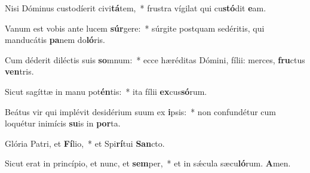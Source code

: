 \item Nisi Dóminus custodíerit civi\textbf{tá}tem,~* frustra vígilat qui cu\textbf{stó}dit \textbf{e}am.
\item Vanum est vobis ante lucem \textbf{súr}gere:~* súrgite postquam sedéritis, qui manducátis \textbf{pa}nem do\textbf{ló}ris.
\item Cum déderit diléctis suis \textbf{so}mnum:~* ecce hæréditas Dómini, fílii: merces, \textbf{fru}ctus \textbf{ven}tris.
\item Sicut sagíttæ in manu pot\textbf{én}tis:~* ita fílii \textbf{ex}cus\textbf{só}rum.
\item Beátus vir qui implévit desidérium suum ex \textbf{i}psis:~* non confundétur cum loquétur inimícis \textbf{su}is in \textbf{por}ta.
\item Glória Patri, et \textbf{Fí}lio,~* et Spi\textbf{rí}tui \textbf{San}cto.
\item Sicut erat in princípio, et nunc, et \textbf{sem}per,~* et in sǽcula sæcu\textbf{ló}rum. \textbf{A}men.
